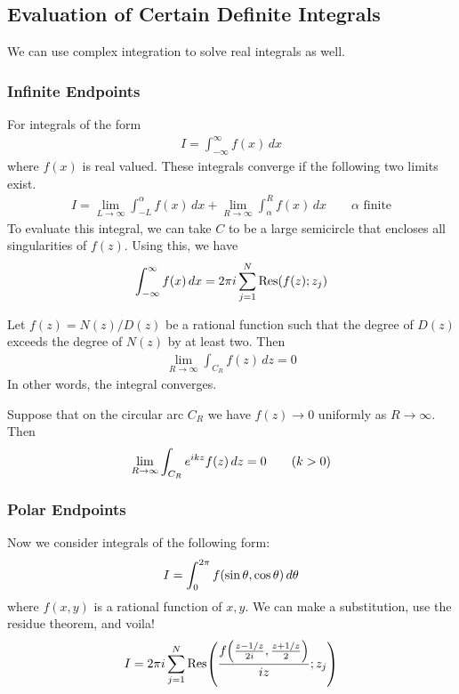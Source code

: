     \subsection{Evaluation of Certain Definite Integrals}
    We can use complex integration to solve real integrals as well.
        \subsubsection{Infinite Endpoints}
        For integrals of the form
        \begin{align*}
            I = \int_{-\infty}^\infty f(x) \, dx
        \end{align*}
        where $f(x)$ is real valued. These integrals converge if the following
        two limits exist.
        \begin{align*}
            I = \lim_{L\to\infty} \int_{-L}^\alpha f(x) \, dx +
            \lim_{R \to \infty} \int_\alpha^R f(x) \, dx \qquad
            \alpha \text{ finite}
        \end{align*}
        To evaluate this integral, we can take $C$ to be a large semicircle that
        encloses all singularities of $f(z)$. Using this, we have
        \begin{align*}
            \int_{-\infty}^\infty f(x) \, dx =
            2 \pi i \sum_{j=1}^N \text{Res}{\left( f(z);z_j \right)}
        \end{align*}
        \begin{thm}
            Let $f(z) = N(z) / D(z)$ be a rational function such that the degree
            of $D(z)$ exceeds the degree of $N(z)$ by at least two. Then
            \begin{align*}
                \lim_{R\to\infty} \int_{C_R} f(z) \, dz = 0
            \end{align*}
            In other words, the integral converges.
        \end{thm}
        \begin{thm}
            Suppose that on the circular arc $C_R$ we have $f(z) \to 0$
            uniformly as $R\to\infty$. Then
            \begin{align*}
                \lim_{R\to\infty} \int_{C_R} e^{i k z} f(z) \, dz = 0 \qquad
                {\left( k > 0 \right)}
            \end{align*}
        \end{thm}
        \subsubsection{Polar Endpoints}
        Now we consider integrals of the following form:
        \begin{align*}
            I = \int_0^{2\pi} f{\left( \sin \theta, \cos \theta \right)} \, d\theta
        \end{align*}
        where $f(x, y)$ is a rational function of $x, y$. We can make a
        substitution, use the residue theorem, and voila!
        \begin{align*}
            I = 2 \pi i \sum_{j=1}^N \text{Res}{\left( 
                \frac{f{\left( \frac{z - 1 / z}{2i}, \frac{z+1/z}{2} \right)}}{i z};
                z_j
             \right)}
        \end{align*}

